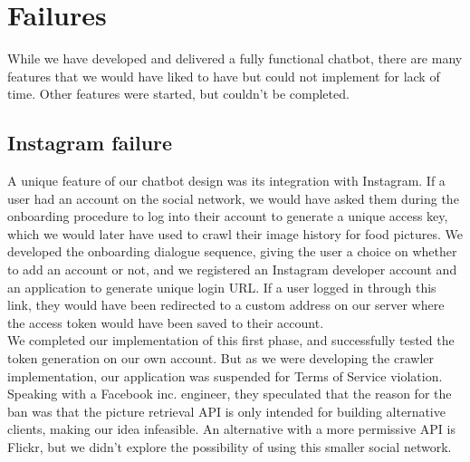 \section{Failures}
While we have developed and delivered a fully functional chatbot, there are many features that we would have liked to have but could not implement for lack of time. Other features were started, but couldn't be completed.
\subsection*{Instagram failure}
A unique feature of our chatbot design was its integration with Instagram. If a user had an account on the social network, we would have asked them during the onboarding procedure to log into their account to generate a unique access key, which we would later have used to crawl their image history for food pictures.
We developed the onboarding dialogue sequence, giving the user a choice on whether to add an account or not, and we registered an Instagram developer account and an application to generate unique login URL. If a user logged in through this link, they would have been redirected to a custom address on our server where the access token would have been saved to their account. \\
We completed our implementation of this first phase, and successfully tested the token generation on our own account. But as we were developing the crawler implementation, our application was suspended for Terms of Service violation. Speaking with a Facebook inc. engineer, they speculated that the reason for the ban was that the picture retrieval API is only intended for building alternative clients, making our idea infeasible. An alternative with a more permissive API is Flickr, but we didn't explore the possibility of using this smaller social network.
